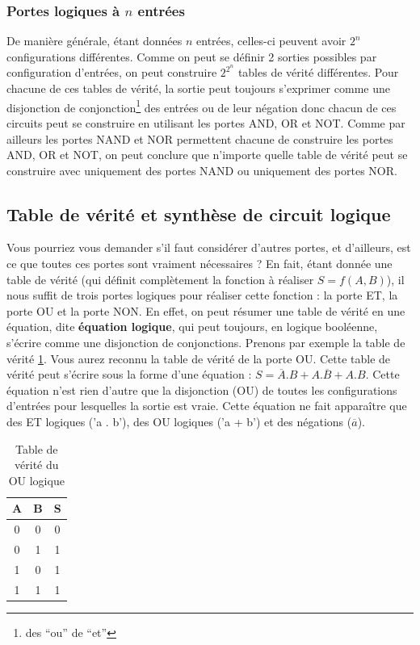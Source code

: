 \pagebreak
\subsubsection{Portes logiques à $n$ entrées}

De manière générale, étant données $n$ entrées, celles-ci peuvent avoir $2^n$ configurations différentes. Comme on peut se définir 2 sorties possibles par configuration d'entrées, on peut construire $2^{2^n}$ tables de vérité différentes. Pour chacune de ces tables de vérité, la sortie peut toujours s'exprimer comme une disjonction de conjonction\footnote{des ``ou'' de ``et''} des entrées ou de leur négation donc chacun de ces circuits peut se construire en utilisant les portes AND, OR et NOT. Comme par ailleurs les portes NAND et NOR permettent chacune de construire les portes AND, OR et NOT, on peut conclure que n'importe quelle table de vérité peut se construire avec uniquement des portes NAND ou uniquement des portes NOR.

\subsection{Table de vérité et synthèse de circuit logique}

Vous pourriez vous demander s'il faut considérer d'autres portes, et d'ailleurs, est ce que toutes ces portes sont vraiment nécessaires ? En fait, étant donnée une table de vérité (qui définit complètement la fonction à réaliser $S = f(A, B)$), il nous suffit de trois portes logiques pour réaliser cette fonction : la porte ET, la porte OU et la porte NON. En effet, on peut résumer une table de vérité en une équation, dite \textbf{équation logique}, qui peut toujours, en logique booléenne, s'écrire comme une disjonction de conjonctions. Prenons par exemple la table de vérité \ref{table:ou_logique}. Vous aurez reconnu la table de vérité de la porte OU. Cette table de vérité peut s'écrire sous la forme d'une équation : $S = \overline{A}. B + A . \overline{B} + A.B$. Cette équation n'est rien d'autre que la disjonction (OU) de toutes les configurations d'entrées pour lesquelles la sortie est vraie. Cette équation ne fait apparaître que des ET logiques ('a . b'), des OU logiques ('a + b') et des négations ($\overline{a}$).


\begin{table}[h]
\begin{center}
 \begin{tabular}{cc|c}
A & B & S\\
\hline
0 & 0 & 0 \\
0 & 1 & 1\\
1 & 0 & 1\\
1 & 1 & 1
\end{tabular}
\end{center}
\caption{\label{table:ou_logique} Table de vérité du OU logique}
\end{table}

